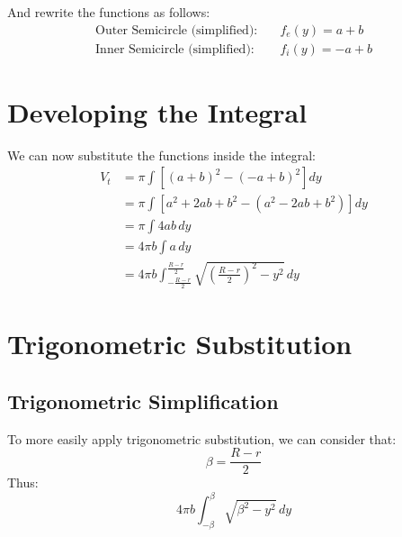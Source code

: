 \documentclass{article}
\begin{document}
	And rewrite the functions as follows:
	\begin{align*}
		\text{Outer Semicircle (simplified):} & \quad f_e(y) = a + b \\
		\text{Inner Semicircle (simplified):} & \quad f_i(y) = -a + b
	\end{align*}
	
	\section*{Developing the Integral}
	We can now substitute the functions inside the integral:
	\begin{align*}
		V_t &= \pi \int \left[ (a + b)^2 - (-a + b)^2 \right] dy \\
		&= \pi \int \left[ a^2 + 2ab + b^2 - (a^2 - 2ab + b^2) \right] dy \\
		&= \pi \int 4ab \, dy \\
		&= 4\pi b \int a \, dy \\
		&= 4\pi b \int_{-\frac{R-r}{2}}^{\frac{R-r}{2}} \sqrt{\left(\frac{R-r}{2}\right)^2 - y^2} \, dy
	\end{align*}
	
	\section*{Trigonometric Substitution}
	\subsection*{Trigonometric Simplification}
	To more easily apply trigonometric substitution, we can consider that:
	\[ \beta=\frac{R-r}{2}\]
	Thus:
	\[4\pi b \int_{-\beta}^{\beta} \sqrt{\beta^2 - y^2} \, dy\]
\end{document}
